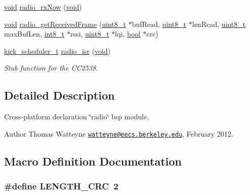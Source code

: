 \begin{DoxyCompactItemize}
\item 
\hyperlink{usb__devapi_8h_afabf60e7f57651d6d595a02c75f07cd0}{void} \hyperlink{group__radio_ga332cd3358e1d2598d42716d702684473}{radio\+\_\+rx\+Now} (\hyperlink{usb__devapi_8h_afabf60e7f57651d6d595a02c75f07cd0}{void})
\item 
\hyperlink{usb__devapi_8h_afabf60e7f57651d6d595a02c75f07cd0}{void} \hyperlink{group__radio_ga1ba47d80eee0a4a3b6d23cfde6b94c9e}{radio\+\_\+get\+Received\+Frame} (\hyperlink{_p_e___types_8h_aba7bc1797add20fe3efdf37ced1182c5}{uint8\+\_\+t} $\ast$buf\+Read, \hyperlink{_p_e___types_8h_aba7bc1797add20fe3efdf37ced1182c5}{uint8\+\_\+t} $\ast$len\+Read, \hyperlink{_p_e___types_8h_aba7bc1797add20fe3efdf37ced1182c5}{uint8\+\_\+t} max\+Buf\+Len, \hyperlink{_p_e___types_8h_aef44329758059c91c76d334e8fc09700}{int8\+\_\+t} $\ast$rssi, \hyperlink{_p_e___types_8h_aba7bc1797add20fe3efdf37ced1182c5}{uint8\+\_\+t} $\ast$lqi, \hyperlink{_p_e___types_8h_a97a80ca1602ebf2303258971a2c938e2}{bool} $\ast$crc)
\item 
\hyperlink{group__board_gac9ebdcc0a4f3c8422f5f4f0fbbe0ded0}{kick\+\_\+scheduler\+\_\+t} \hyperlink{group__radio_ga42deb4291adeb8f9d6607133422f6023}{radio\+\_\+isr} (\hyperlink{usb__devapi_8h_afabf60e7f57651d6d595a02c75f07cd0}{void})
\begin{DoxyCompactList}\small\item\em Stub function for the C\+C2538. \end{DoxyCompactList}\end{DoxyCompactItemize}


\subsection{Detailed Description}
Cross-\/platform declaration \char`\"{}radio\char`\"{} bsp module. 

\begin{DoxyAuthor}{Author}
Thomas Watteyne \href{mailto:watteyne@eecs.berkeley.edu}{\tt watteyne@eecs.\+berkeley.\+edu}, February 2012. 
\end{DoxyAuthor}


\subsection{Macro Definition Documentation}
\subsubsection[{\texorpdfstring{L\+E\+N\+G\+T\+H\+\_\+\+C\+RC}{LENGTH_CRC}}]{\setlength{\rightskip}{0pt plus 5cm}\#define L\+E\+N\+G\+T\+H\+\_\+\+C\+RC~2}\hypertarget{group__radio_ga66b45cefa7e813509629dfff0680c50b}{}\label{group__radio_ga66b45cefa7e813509629dfff0680c50b}


